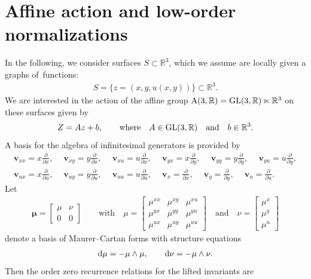 \documentclass[pdftex]{sigma}%
\numberwithin{equation}{section}
\newcommand{\bmu}{\boldsymbol{\mu}}
\newcommand{\pp}[2]{\frac{\partial #1}{\partial #2}}
\newcommand{\vv}{\mathbf{v}}
\begin{document}
\section{Affine action and low-order normalizations}\label{sec:low-order normalizations}

In the following, we consider surfaces $S\subset \mathbb{R}^3$, which we assume are locally given a graphs of~functions:
\begin{gather*}
S = \{z=(x,y,u(x,y))\} \subset \mathbb{R}^3.
\end{gather*}
We are interested in the action of the affine group ${\rm A}(3,\mathbb{R}) = {\rm GL}(3,\mathbb{R})\ltimes \mathbb{R}^3$ on these surfaces given by
\begin{gather*}
Z = Az+b,\qquad\text{where}\quad A\in {\rm GL}(3,\mathbb{R})\quad\text{and}\quad b\in \mathbb{R}^3.
\end{gather*}
A basis for the algebra of infinitesimal generators is provided by
%
\begin{gather*}
\vv_{xx} = x\pp{}{x},\quad\ \vv_{xy} = y\pp{}{x},\quad\ \vv_{xu} = u \pp{}{x},\quad\ \vv_{yx} = x\pp{}{y},\quad\ \vv_{yy} = y\pp{}{y},\quad\ \vv_{yu} = u\pp{}{y},
\\
\vv_{ux} = x\pp{}{u},\quad\ \vv_{uy} = y\pp{}{u},\quad\ \vv_{uu} = u\pp{}{u},\quad\ \vv_x = \pp{}{x},\quad\ \vv_y = \pp{}{y},\quad\ \vv_u = \pp{}{u}.
\end{gather*}
%
Let
\begin{gather*}
\bmu=\begin{bmatrix}
\mu &\nu \\
0 & 0
\end{bmatrix}\qquad\text{with}\quad
\mu = \begin{bmatrix}
\mu^{xx} & \mu^{xy} & \mu^{xu} \\
\mu^{yx} & \mu^{yy} & \mu^{yu} \\
\mu^{ux} & \mu^{uy} & \mu^{uu}
\end{bmatrix}
\quad\text{and}\quad
\nu = \begin{bmatrix}
\mu^x \\ \mu^y \\ \mu^u
\end{bmatrix}
\end{gather*}
denote a basis of Maurer--Cartan forms with structure equations
\begin{gather*}
{\rm d}\mu = -\mu \wedge \mu,\qquad
{\rm d}\nu = - \mu\wedge \nu.
\end{gather*}
Then the order zero recurrence relations for the lifted invariants are
\end{document}
